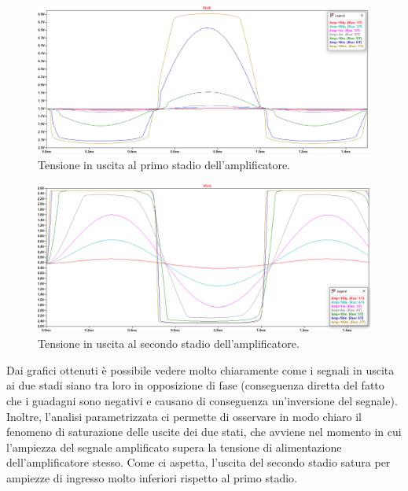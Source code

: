 \documentclass[a4paper,10pt]{article}
\begin{document}
\begin{figure}[h!]
  	\centering
 	\includegraphics[width=1\linewidth]{es1-5-n41.png}
  	\caption{Tensione in uscita al primo stadio dell'amplificatore.}
  	\label{fig:vidv4}
\end{figure}
\begin{figure}[h!]
  	\centering
 	\includegraphics[width=1\linewidth]{es1-5-out1.png}
  	\caption{Tensione in uscita al secondo stadio dell'amplificatore.}
  	\label{fig:vidvo}
\end{figure}

Dai grafici ottenuti è possibile vedere molto chiaramente come i segnali in uscita ai due stadi siano tra loro in opposizione di fase (conseguenza diretta del fatto che i guadagni sono negativi e causano di conseguenza un'inversione del segnale). Inoltre, l'analisi parametrizzata ci permette di osservare in modo chiaro il fenomeno di saturazione delle uscite dei due stati, che avviene nel momento in cui l'ampiezza del segnale amplificato supera la tensione di alimentazione dell'amplificatore stesso. Come ci aspetta, l'uscita del secondo stadio satura per ampiezze di ingresso molto inferiori rispetto al primo stadio. 

\newpage
\end{document}
